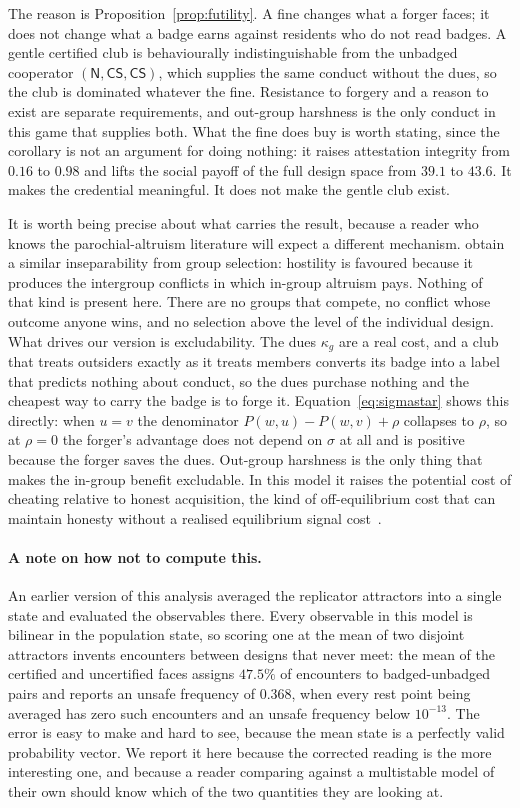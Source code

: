 \documentclass[11pt,a4paper]{article}
\theoremstyle{definition}
\newcommand{\CS}{\textsf{CS}}
\begin{document}
The reason is Proposition~\ref{prop:futility}. A fine changes what a forger
faces; it does not change what a badge earns against residents who do not read
badges. A gentle certified club is behaviourally indistinguishable from the
unbadged cooperator $(\mathsf{N}, \CS, \CS)$, which supplies the same conduct
without the dues, so the club is dominated whatever the fine. Resistance to
forgery and a reason to exist are separate requirements, and out-group
harshness is the only conduct in this game that supplies both. What the fine
does buy is worth stating, since the corollary is not an argument for doing
nothing: it raises attestation integrity from $0.16$ to $0.98$ and lifts the
social payoff of the full design space from $39.1$ to $43.6$. It makes the
credential meaningful. It does not make the gentle club exist.

It is worth being precise about what carries the result, because a reader who
knows the parochial-altruism literature will expect a different mechanism.
\citet{choi2007parochial} obtain a similar inseparability from group selection:
hostility is favoured because it produces the intergroup conflicts in which
in-group altruism pays. Nothing of that kind is present here. There are no
groups that compete, no conflict whose outcome anyone wins, and no selection
above the level of the individual design. What drives our version is
excludability. The dues $\kappa_g$ are a real cost, and a club that treats
outsiders exactly as it treats members converts its badge into a label that
predicts nothing about conduct, so the dues purchase nothing and the cheapest
way to carry the badge is to forge it. Equation~\eqref{eq:sigmastar} shows this
directly: when $u = v$ the denominator $P(w,u) - P(w,v) + \rho$ collapses to
$\rho$, so at $\rho = 0$ the forger's advantage does not depend on $\sigma$ at
all and is positive because the forger saves the dues. Out-group harshness is
the only thing that makes the in-group benefit excludable. In this model it
raises the potential cost of cheating relative to honest acquisition, the kind
of off-equilibrium cost that can maintain honesty without a realised
equilibrium signal cost~\citep{szamado2011cost}.

\paragraph{A note on how not to compute this.}
An earlier version of this analysis averaged the replicator attractors into a
single state and evaluated the observables there. Every observable in this
model is bilinear in the population state, so scoring one at the mean of two
disjoint attractors invents encounters between designs that never meet: the
mean of the certified and uncertified faces assigns $47.5\%$ of encounters to
badged-unbadged pairs and reports an unsafe frequency of $0.368$, when every
rest point being averaged has zero such encounters and an unsafe frequency below
$10^{-13}$. The error is easy to make and hard to see, because the mean state
is a perfectly valid probability vector. We report it here because the
corrected reading is the more interesting one, and because a reader comparing
against a multistable model of their own should know which of the two
quantities they are looking at.
\end{document}
